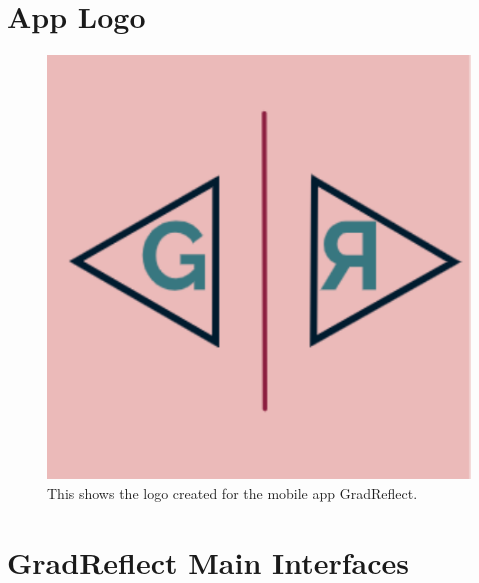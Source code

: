 \documentclass{l4proj}
\begin{document}
\begin{appendices}
%

\section{App Logo} \label{Appendix-AppLogo}

\begin{figure}[H]
    \centering
    \includegraphics[scale=1]{images/AppLogo.pdf}    
    \caption{This shows the logo created for the mobile app GradReflect.}
    \label{fig:AppLogo} 
\end{figure}

%

\section{GradReflect Main Interfaces} \label{Appendix-AppInterfaces}


\end{appendices}
\end{document}
